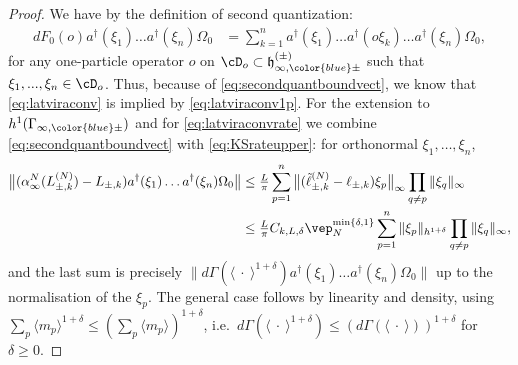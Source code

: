 \documentclass[a4paper, 11pt]{article}
\newcommand{\fh}{\mathfrak{h}}
\DeclareMathOperator{\1}{\mathds{1}}
\begin{document}
\begin{proof}
We have by the definition of second quantization:
\begin{align*}
dF_{0}(o)a^{\dagger}(\xi_{1})\dots a^{\dagger}(\xi_{n})\Omega_{0} & = \sum^{n}_{k=1}a^{\dagger}(\xi_{1})\dots a^{\dagger}(o\xi_{k})\dots a^{\dagger}(\xi_{n})\Omega_{0},
\end{align*}
for any one-particle operator $o$ on $\cD_{o}\subset\fh^{(\pm)}_{\infty,{\color{blue}\pm}}$ such that $\xi_{1},...,\xi_{n}\in\cD_{o}$. Thus, because of \eqref{eq:secondquantboundvect}, we know that \eqref{eq:latviraconv} is implied by \eqref{eq:latviraconv1p}. For the extension to $h^{1}(\Gamma_{\infty,{\color{blue}\pm}})$ and for \eqref{eq:latviraconvrate} we combine \eqref{eq:secondquantboundvect} with \eqref{eq:KSrateupper}: for orthonormal $\xi_{1},\dots,\xi_{n}$,
\begin{align*}
\big\|(\alpha^{N}_{\infty}(L^{(N)}_{\pm,k})-L_{\pm,k})a^{\dagger}(\xi_{1})\dots a^{\dagger}(\xi_{n})\Omega_{0}\big\| & \leq \tfrac{L}{\pi}\sum_{p=1}^{n}\big\|(\tilde{\ell}^{(N)}_{\pm,k}-\ell_{\pm,k})\xi_{p}\big\|_{\infty}\prod_{q\neq p}\|\xi_{q}\|_{\infty} \\
& \leq \tfrac{L}{\pi}C_{k,L,\delta}\vep_{N}^{\min\{\delta,1\}}\sum_{p=1}^{n}\|\xi_{p}\|_{h^{1+\delta}}\prod_{q\neq p}\|\xi_{q}\|_{\infty},
\end{align*}
and the last sum is precisely $\|d\Gamma(\langle\!\ \cdot\!\ \rangle^{1+\delta})a^{\dagger}(\xi_{1})\dots a^{\dagger}(\xi_{n})\Omega_{0}\|$ up to the normalisation of the $\xi_{p}$. The general case follows by linearity and density, using $\sum_{p}\langle m_{p}\rangle^{1+\delta}\leq(\sum_{p}\langle m_{p}\rangle)^{1+\delta}$, i.e.~$d\Gamma(\langle\!\ \cdot\!\ \rangle^{1+\delta})\leq(d\Gamma(\langle\!\ \cdot\!\ \rangle))^{1+\delta}$ for $\delta\geq0$.
\end{proof}
\end{document}
